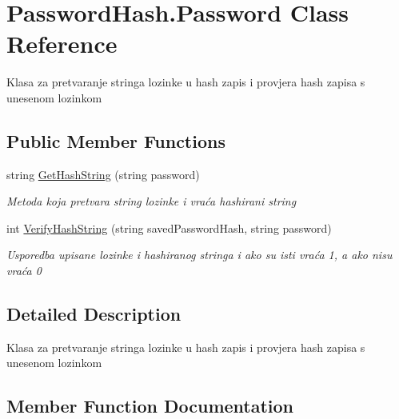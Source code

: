 \hypertarget{class_password_hash_1_1_password}{}\section{Password\+Hash.\+Password Class Reference}
\label{class_password_hash_1_1_password}


Klasa za pretvaranje stringa lozinke u hash zapis i provjera hash zapisa s unesenom lozinkom  


\subsection*{Public Member Functions}
\begin{DoxyCompactItemize}
\item 
string \mbox{\hyperlink{class_password_hash_1_1_password_a87f41cd184f99c0d579e098e7edb8c77}{Get\+Hash\+String}} (string password)
\begin{DoxyCompactList}\small\item\em Metoda koja pretvara string lozinke i vraća hashirani string \end{DoxyCompactList}\item 
int \mbox{\hyperlink{class_password_hash_1_1_password_aeaea787c192b9ccbb753ac1e9f8ab325}{Verify\+Hash\+String}} (string saved\+Password\+Hash, string password)
\begin{DoxyCompactList}\small\item\em Usporedba upisane lozinke i hashiranog stringa i ako su isti vraća 1, a ako nisu vraća 0 \end{DoxyCompactList}\end{DoxyCompactItemize}


\subsection{Detailed Description}
Klasa za pretvaranje stringa lozinke u hash zapis i provjera hash zapisa s unesenom lozinkom 



\subsection{Member Function Documentation}
\mbox{\label{class_password_hash_1_1_password_a87f41cd184f99c0d579e098e7edb8c77}} 
